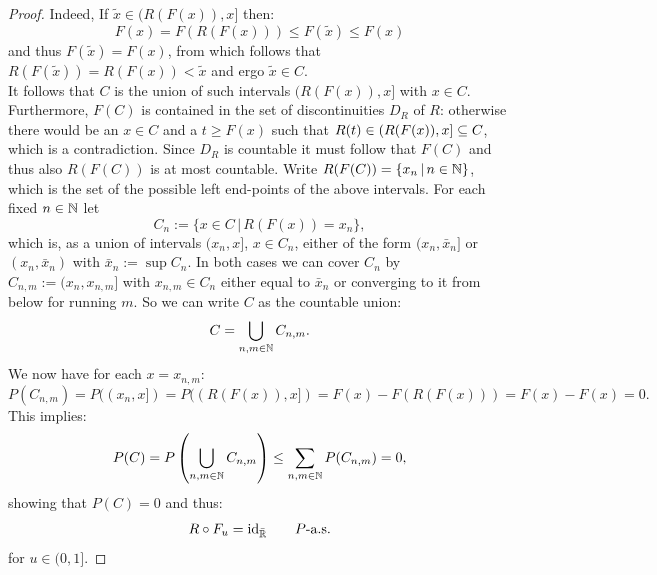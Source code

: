 \begin{Lem}
\begin{proof}
Indeed, If $\tilde{x} \in (R(F(x)),x]$ then: 
\[F(x)=F(R(F(x))) \le F(\tilde{x}) \le F(x)\]
and thus $F(\tilde{x})=F(x)$, from which follows that $R(F(\tilde{x}))=R(F(x))<\tilde{x}$ and ergo $\tilde{x} \in C$.\\
It follows that $C$ is the union of such intervals $(R(F(x)),x]$ with $x \in C$. Furthermore, $F(C)$ is contained in the set of discontinuities $D_R$ of $R$: otherwise there would be an $x \in C$ and a $t \ge F(x)$ such that $R(t) \in (R(F(x)),x] \subseteq C$, which is a contradiction.
Since $D_R$ is countable it must follow that $F(C)$ and thus also $R(F(C))$ is at most countable. Write $R(F(C))=\{x_n\,|\,n \in\mathbb{N}\}$, which is the set of the possible left end-points of the above intervals. 
For each fixed $n \in \mathbb{N}$ let 
\[ C_n:= \{ x \in C\,|\, R(F(x)) = x_n\}, \]
which is, as a union of intervals $(x_n,x]$, $x \in C_n$, either of the form $(x_n,\bar x_n]$ or $(x_n,\bar x_n)$ with $\bar x_n:= \sup C_n$. In both cases we can cover $C_n$ by 
$C_{n,m}:=(x_n,x_{n,m}]$ with $x_{n,m}\in C_n$ either equal to $\bar x_n$ or converging to it from below for running $m$.
So we can write $C$ as the countable union:
\[ C = \bigcup_{n,m \in \mathbb{N}} C_{n,m}.\]
We now have for each $x=x_{n,m}$:
\[P(C_{n,m}) = P((x_n,x]) = P((R(F(x)),x])=F(x) - F(R(F(x)))  = F(x)-F(x)=0.\]
This implies: 
\[P(C) = P\left(\bigcup_{n,m \in \mathbb{N}} C_{n,m} \right) \le \sum_{n,m \in \mathbb{N}} P(C_{n,m})=0,\]
showing that $P(C) =0$ and thus:
 \[ R \circ F_u  = \mathrm{id}_{\bar{\mathbb{R}}}\qquad P\text{-a.s.} \]
 for $u \in (0,1]$.
\end{proof}
\end{Lem}


